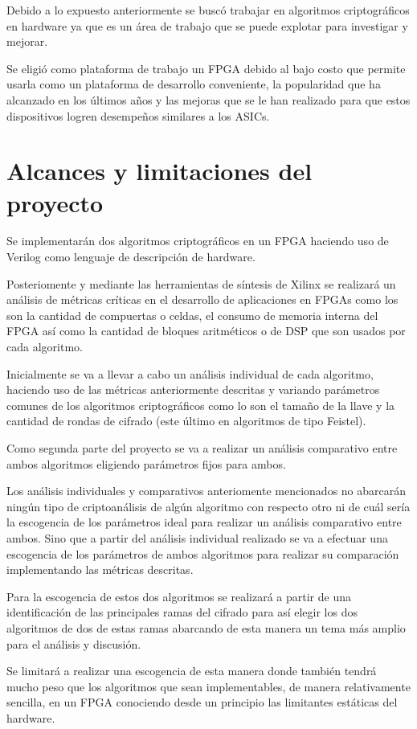 Debido a lo expuesto anteriormente se buscó trabajar en algoritmos criptográficos en hardware ya que es un área de trabajo que se puede explotar para investigar y mejorar.

Se eligió como plataforma de trabajo un FPGA debido al bajo costo que permite usarla como un plataforma de desarrollo conveniente, la popularidad que ha alcanzado en los últimos años y las mejoras que se le han realizado para que estos dispositivos logren desempeños similares a los ASICs.

\section{Alcances y limitaciones del proyecto}
Se implementarán dos algoritmos criptográficos en un FPGA haciendo uso de Verilog como lenguaje de descripción de hardware. 

Posteriomente y mediante las herramientas de síntesis de Xilinx se realizará un análisis de métricas críticas en el desarrollo de aplicaciones en FPGAs como los son la cantidad de compuertas o celdas, el consumo de memoria interna del FPGA así como la cantidad de bloques aritméticos o de DSP que son usados por cada algoritmo. 

Inicialmente se va a llevar a cabo un análisis individual de cada algoritmo, haciendo uso de las métricas anteriormente descritas y variando parámetros comunes de los algoritmos criptográficos como lo son el tamaño de la llave y la cantidad de rondas de cifrado (este último en algoritmos de tipo Feistel). 

Como segunda parte del proyecto se va a realizar un análisis comparativo entre ambos algoritmos eligiendo parámetros fijos para ambos.

Los análisis individuales y comparativos anteriomente mencionados no abarcarán ningún tipo de criptoanálisis de algún algoritmo con respecto otro ni de cuál sería la escogencia de los parámetros ideal para realizar un análisis comparativo entre ambos. Sino que a partir del análisis individual realizado se va a efectuar una escogencia de los parámetros de ambos algoritmos para realizar su comparación implementando las métricas descritas.

Para la escogencia de estos dos algoritmos se realizará a partir de una identificación de las principales ramas del cifrado para así elegir los dos algoritmos de dos de estas ramas abarcando de esta manera un tema más amplio para el análisis y discusión.

Se limitará a realizar una escogencia de esta manera donde también tendrá mucho peso que los algoritmos que sean implementables, de manera relativamente sencilla, en un FPGA conociendo desde un principio las limitantes estáticas del hardware.


